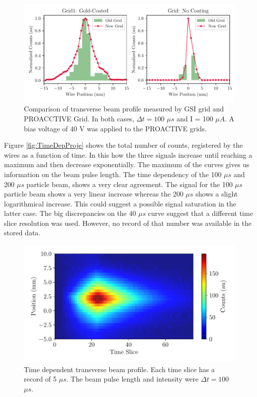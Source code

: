 \begin{figure}[h]
    \centering
    \includegraphics[width=1.0\columnwidth]{OldNewProfileCompa/OldNewProfileCompa.pdf}
    \caption{Comparison of transverse beam profile measured by GSI grid and PROACCTIVE Grid. In both cases, $\Delta t = 100 $ $\mu s$ and I = 100 $\mu A$. A bias voltage of 40 V was applied to the PROACTIVE grids.}
    \label{fig:OldNewProfCompa}
\end{figure}


Figure \ref{fig:TimeDepProje} shows the total number of counts, registered by the wires as a function of time. In this how the three signals increase until reaching a maximum and then decrease exponentially. The maximum of the curves gives us information on the beam pulse length. The time dependency of the 100 $\mu s$ and 200 $\mu s$ particle beam, shows a very clear agreement. The signal for the 100 $\mu s$ particle beam shows a very linear increase whereas the 200 $\mu s$ shows a slight logarithmical increase. This could suggest a possible signal saturation in the latter case. The big discrepancies on the 40 $\mu s$ curve suggest that a different time slice resolution was used. However, no record of that number was available in the stored data. 


\begin{figure}[h]
    \centering
    \includegraphics[width=0.9\columnwidth]{FancyProfileWithTime/FancyTimeEvolution.pdf}
    \caption{Time dependent transverse beam profile. Each time slice has a record of 5 $\mu s$. The beam pulse length and intensity were $\Delta t = 100 $ $\mu s$.}
    \label{fig:FancyTime1}
\end{figure}


